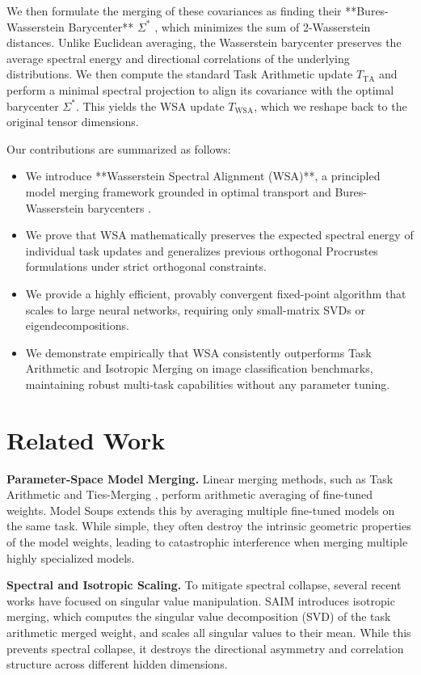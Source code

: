 \documentclass{article}
\theoremstyle{plain}
\theoremstyle{definition}
\theoremstyle{remark}
\begin{document}
We then formulate the merging of these covariances as finding their **Bures-Wasserstein Barycenter** $\Sigma^*$ \cite{agueh11}, which minimizes the sum of 2-Wasserstein distances. Unlike Euclidean averaging, the Wasserstein barycenter preserves the average spectral energy and directional correlations of the underlying distributions. We then compute the standard Task Arithmetic update $T_{\text{TA}}$ and perform a minimal spectral projection to align its covariance with the optimal barycenter $\Sigma^*$. This yields the WSA update $T_{\text{WSA}}$, which we reshape back to the original tensor dimensions.

Our contributions are summarized as follows:
\begin{itemize}
  \item We introduce **Wasserstein Spectral Alignment (WSA)**, a principled model merging framework grounded in optimal transport and Bures-Wasserstein barycenters \cite{agueh11}.
  \item We prove that WSA mathematically preserves the expected spectral energy of individual task updates and generalizes previous orthogonal Procrustes formulations under strict orthogonal constraints.
  \item We provide a highly efficient, provably convergent fixed-point algorithm \cite{bhatia19} that scales to large neural networks, requiring only small-matrix SVDs or eigendecompositions.
  \item We demonstrate empirically that WSA consistently outperforms Task Arithmetic and Isotropic Merging on image classification benchmarks, maintaining robust multi-task capabilities without any parameter tuning.
\end{itemize}

\section{Related Work}
\label{submission-related-work}

\textbf{Parameter-Space Model Merging.} Linear merging methods, such as Task Arithmetic \cite{ilharco22} and Ties-Merging \cite{yadav23}, perform arithmetic averaging of fine-tuned weights. Model Soups \cite{wortsman22} extends this by averaging multiple fine-tuned models on the same task. While simple, they often destroy the intrinsic geometric properties of the model weights, leading to catastrophic interference when merging multiple highly specialized models.

\textbf{Spectral and Isotropic Scaling.} To mitigate spectral collapse, several recent works have focused on singular value manipulation. SAIM \cite{saim} introduces isotropic merging, which computes the singular value decomposition (SVD) of the task arithmetic merged weight, and scales all singular values to their mean. While this prevents spectral collapse, it destroys the directional asymmetry and correlation structure across different hidden dimensions.
\end{document}
